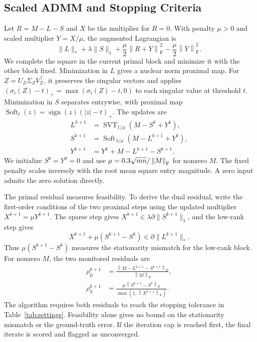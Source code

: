 \documentclass[conference]{IEEEtran}
\newcommand{\fro}[1]{\left\|#1\right\|_{\mathrm F}}
\newcommand{\svt}{\operatorname{SVT}}
\newcommand{\soft}{\operatorname{Soft}}
\begin{document}
\subsection{Scaled ADMM and Stopping Criteria}
Let $R=M-L-S$ and $X$ be the multiplier for $R=0$. With penalty $\mu>0$ and scaled multiplier $Y=X/\mu$, the augmented Lagrangian is
\begin{equation}
  \|L\|_*+\lambda\|S\|_1
  +\frac{\mu}{2}\fro{R+Y}^{2}-\frac{\mu}{2}\fro{Y}^{2}.
  \label{eq:lagrangian}
\end{equation}
We complete the square in the current primal block and minimize it with the other block fixed. Minimization in $L$ gives a nuclear norm proximal map. For $Z=U_Z\Sigma_Z V_Z^\top$, it preserves the singular vectors and applies $(\sigma_i(Z)-t)_+=\max(\sigma_i(Z)-t,0)$ to each singular value at threshold $t$. Minimization in $S$ separates entrywise, with proximal map $\soft_t(z)=\operatorname{sign}(z)(|z|-t)_+$. The updates are
\begin{align}
 L^{k+1}&=\svt_{1/\mu}(M-S^k+Y^k), \label{eq:l_update}\\
 S^{k+1}&=\soft_{\lambda/\mu}(M-L^{k+1}+Y^k), \label{eq:s_update}\\
 Y^{k+1}&=Y^k+M-L^{k+1}-S^{k+1}. \label{eq:y_update}
\end{align}
We initialize $S^0=Y^0=0$ and use $\mu=\PenaltyScale\sqrt{mn}/\fro{M}$ for nonzero $M$. The fixed penalty scales inversely with the root mean square entry magnitude. A zero input admits the zero solution directly.

The primal residual measures feasibility. To derive the dual residual, write the first-order conditions of the two proximal steps using the updated multiplier $X^{k+1}=\mu Y^{k+1}$. The sparse step gives $X^{k+1}\in\lambda\partial\|S^{k+1}\|_1$, and the low-rank step gives
\begin{equation}
 X^{k+1}+\mu(S^{k+1}-S^k)\in\partial\|L^{k+1}\|_*.
\end{equation}
Thus $\mu(S^{k+1}-S^k)$ measures the stationarity mismatch for the low-rank block. For nonzero $M$, the two monitored residuals are
\begin{align}
 \rho_{\mathrm p}^{k+1}&=\frac{\fro{M-L^{k+1}-S^{k+1}}}{\fro{M}}, \label{eq:primal}\\
 \rho_{\mathrm d}^{k+1}&=\frac{\mu\fro{S^{k+1}-S^k}}{\max(1,\fro{X^{k+1}})}. \label{eq:dual}
\end{align}
The algorithm requires both residuals to reach the stopping tolerance in Table~\ref{tab:settings}. Feasibility alone gives no bound on the stationarity mismatch or the ground-truth error. If the iteration cap is reached first, the final iterate is scored and flagged as unconverged.
\end{document}
